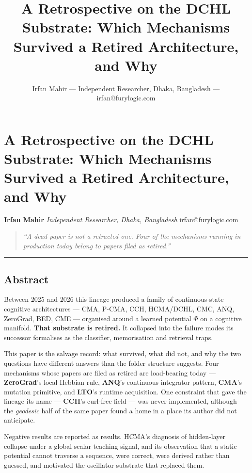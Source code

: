 \documentclass[
  11pt,
  a4paper,
]{article}
\title{A Retrospective on the DCHL Substrate: Which Mechanisms Survived
a Retired Architecture, and Why}
\author{Irfan Mahir --- Independent Researcher, Dhaka, Bangladesh ---
irfan@furylogic.com}
\date{}
\begin{document}
\maketitle

{
\hypersetup{linkcolor=}
\setcounter{tocdepth}{3}
\tableofcontents
}
\section{A Retrospective on the DCHL Substrate: Which Mechanisms
Survived a Retired Architecture, and
Why}\label{a-retrospective-on-the-dchl-substrate-which-mechanisms-survived-a-retired-architecture-and-why}

\textbf{Irfan Mahir} \emph{Independent Researcher, Dhaka, Bangladesh}
irfan@furylogic.com

\begin{quote}
\emph{``A dead paper is not a retracted one. Four of the mechanisms
running in production today belong to papers filed as retired.''}
\end{quote}

\begin{center}\rule{0.5\linewidth}{0.5pt}\end{center}

\subsection{Abstract}\label{abstract}

Between 2025 and 2026 this lineage produced a family of continuous-state
cognitive architectures --- CMA, P-CMA, CCH, HCMA/DCHL, CMC, ANQ,
ZeroGrad, BED, CME --- organised around a learned potential \(\Phi\) on
a cognitive manifold. \textbf{That substrate is retired.} It collapsed
into the failure modes its successor formalises as the classifier,
memorisation and retrieval traps.

This paper is the salvage record: what survived, what did not, and why
the two questions have different answers than the folder structure
suggests. Four mechanisms whose papers are filed as retired are
load-bearing today --- \textbf{ZeroGrad}'s local Hebbian rule,
\textbf{ANQ}'s continuous-integrator pattern, \textbf{CMA}'s mutation
primitive, and \textbf{LTO}'s runtime acquisition. One constraint that
gave the lineage its name --- \textbf{CCH}'s curl-free field --- was
never implemented, although the \emph{geodesic} half of the same paper
found a home in a place its author did not anticipate.

Negative results are reported as results. HCMA's diagnosis of
hidden-layer collapse under a global scalar teaching signal, and its
observation that a static potential cannot traverse a sequence, were
correct, were derived rather than guessed, and motivated the oscillator
substrate that replaced them.
\end{document}
